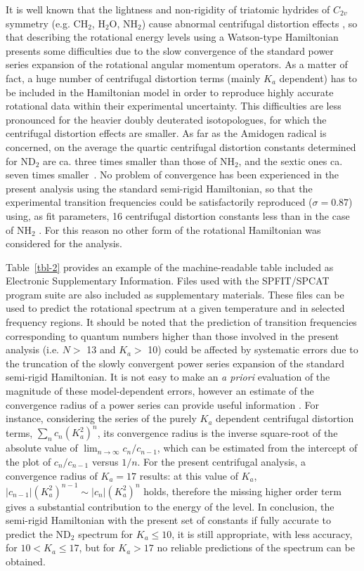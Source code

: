 \documentclass[twocolumn]{aastex61}
\begin{document}
It is well known that the lightness and non-rigidity of triatomic hydrides of $C_{2v}$ symmetry (e.g. CH$_2$, H$_2$O, NH$_2$) cause abnormal
centrifugal distortion effects \citep{Bru05,Yu12,Mar14}, so that describing the rotational energy levels using a Watson-type Hamiltonian presents
some difficulties due to the slow convergence of the standard power series expansion of the rotational angular momentum operators.
As a matter of fact, a huge number of centrifugal distortion terms (mainly $K_a$ dependent) has to be included in the Hamiltonian model in order to
reproduce highly accurate rotational data within their experimental uncertainty.
This difficulties are less pronounced for the heavier doubly deuterated isotopologues, for which the centrifugal distortion effects are smaller.
As far as the Amidogen radical is concerned, on the average the quartic centrifugal distortion constants determined for ND$_2$ are ca. three times
smaller than those of NH$_2$, and the sextic ones ca. seven times smaller~\citep{Mar14}.
No problem of convergence has been experienced in the present analysis using the standard semi-rigid Hamiltonian, so that the experimental transition
frequencies could be satisfactorily reproduced ($\sigma=0.87$) using, as fit parameters, 16 centrifugal distortion constants less than in the case
of NH$_2$ \citep{Mar14}.
For this reason no other form of the rotational Hamiltonian was considered for the analysis.

Table~\ref{tbl-2} provides an example of the machine-readable table included as 
Electronic Supplementary Information. Files used with the SPFIT/SPCAT program suite are also included as supplementary materials.
These files can be used to predict the rotational spectrum at a given temperature and in selected frequency regions.
It should be noted that the prediction of transition frequencies corresponding to quantum numbers higher than those involved in the present analysis
(i.e. $N>$ 13 and $K_{a}>$ 10) could be affected by systematic errors due to the truncation of the slowly convergent power series expansion of the
standard semi-rigid Hamiltonian.
It is not easy to make an {\it a priori} evaluation of the magnitude of these model-dependent errors, however an estimate of the convergence radius
of a power series can provide useful information \citep{Bru05}.
For instance, considering the series of the purely $K_{a}$ dependent centrifugal distortion terms, $\sum_n c_n \left(K_{a}^2\right)^n$,
its convergence radius is the inverse square-root of the absolute value of $\lim_{n\to\infty}{c_{n}/c_{n-1}}$, which can be estimated from the
intercept of the plot of $c_{n}/c_{n-1}$ versus $1/n$. For the present centrifugal analysis, a convergence radius of $K_a = 17$ results:
at this value of $K_a$, $|c_{n-1}|\left(K_{a}^2\right)^{n-1}\sim |c_{n}|\left(K_{a}^2\right)^n$ holds,
therefore the missing higher order term gives a substantial contribution to the energy of the level.
In conclusion, the semi-rigid Hamiltonian with the present set of constants if fully accurate to predict the ND$_2$ spectrum for $K_{a}\leqslant 10$,
it is still appropriate, with less accuracy, for $10 < K_{a}\leqslant 17$, but for $K_a > 17$ no reliable predictions of the spectrum can be obtained.
\end{document}
